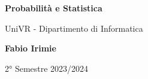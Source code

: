 \begin{titlepage}
	\begin{center}
		\vspace*{1cm}

		\Huge
		\textbf{Probabilità e Statistica}

		\vspace{0.5cm}
		\LARGE
		UniVR - Dipartimento di Informatica

		\vspace{1.5cm}

		\textbf{Fabio Irimie}

		\vfill


		\vspace{0.8cm}


		2° Semestre 2023/2024

	\end{center}
\end{titlepage}
